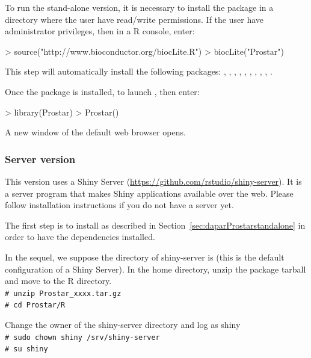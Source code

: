 \documentclass[12pt]{article}
\newcommand{\shellcmd}[1]{\\\indent\indent\texttt{\footnotesize\# #1}}
\begin{document}
To run the stand-alone version, it is necessary to install the package in a 
directory where the user have read/write permissions. If the user have 
administrator privileges, then in a R console, enter:
\begin{Schunk}
\begin{Sinput}
> source("http://www.bioconductor.org/biocLite.R")
> biocLite("Prostar")
\end{Sinput}
\end{Schunk}

This step will automatically install the following packages: , 
, , , 
, , , , ,
.

Once the package is installed, to launch , then enter:
\begin{Schunk}
\begin{Sinput}
> library(Prostar)
> Prostar()
\end{Sinput}
\end{Schunk}

A new window of the default web browser opens. 


\subsubsection{Server version} \label{sec:daparProstarserver}
This version uses a Shiny Server 
(\url{https://github.com/rstudio/shiny-server}). It is a server program that 
makes Shiny applications available over the web. Please follow installation 
instructions if you do not have a server yet.

The first step is to install  as described in 
Section~\ref{sec:daparProstarstandalone} in order to have the dependencies 
installed.


In the sequel, we suppose the directory of shiny-server is 
 (this is the default configuration of a Shiny 
Server). In the home directory, unzip the package tarball and move to the R 
directory.\newline
\shellcmd{unzip Prostar\_xxxx.tar.gz}
\shellcmd{cd Prostar/R}\newline

Change the owner of the shiny-server directory and log as shiny
\shellcmd{sudo chown shiny /srv/shiny-server}
\shellcmd{su shiny}\newline
\end{document}

